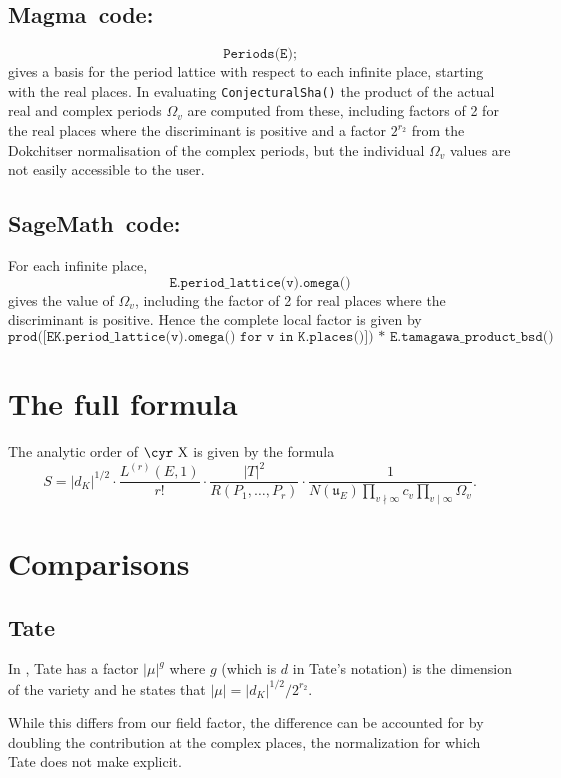 \documentclass{amsart}
\newcommand{\software}[1]{\textsf{#1}} %
\newcommand{\Sage}{\software{SageMath}{}\ }
\newcommand{\Magma}{\software{Magma}{}\ }
\newcommand{\Sha}{\text{\cyr X}}
\begin{document}
\subsection{\Magma code:}\label{magma-5}
\[
\texttt{Periods(E);}
\]
gives a basis for the period lattice with respect to each infinite
place, starting with the real places. In evaluating
\texttt{ConjecturalSha()} the product of the actual real and complex
periods \(\Omega_v\) are computed from these, including factors of 2
for the real places where the discriminant is positive and a factor
\(2^{r_2}\) from the Dokchitser normalisation of the complex periods,
but the individual \(\Omega_v\) values are not easily accessible to
the user.

\subsection{\Sage code:}\label{sage-5}
For each infinite place,
\[
\texttt{E.period\_lattice(v).omega()}
\]
gives the value of \(\Omega_v\), including the factor of 2 for real
places where the discriminant is positive.  Hence the complete local
factor is given by
\[
\texttt{prod({[}EK.period\_lattice(v).omega()\ for\ v\ in\ K.places(){]})\ *\ E.tamagawa\_product\_bsd()}
\]

\section{The full formula}\label{the-full-formula}
The analytic order of $\Sha$ is given by the formula
\[
S =
|d_K|^{1/2}
\cdot
\frac{L^{(r)}(E,1)}{r!}
\cdot
\frac{|T|^2}{R(P_1,\dots,P_r)}
\cdot
\frac{1}{N(\mathfrak{u}_E)\prod_{v\nmid\infty}c_v\prod_{v\mid\infty}\Omega_v}.
\]

\section{Comparisons}\label{comparisons}

\subsection{Tate}\label{tate}

In \cite{Tate}, Tate has a factor \(|\mu|^g\) where \(g\) (which is
\(d\) in Tate's notation) is the dimension of the variety and he
states that \(|\mu|=|d_K|^{1/2}/2^{r_2}\).

While this differs from our field factor, the difference can be
accounted for by doubling the contribution at the complex places, the
normalization for which Tate does not make explicit.
\end{document}
